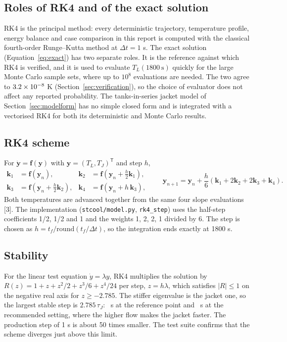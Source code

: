 \documentclass[11pt,letterpaper]{article}
\begin{document}
\subsection{Roles of RK4 and of the exact solution}
RK4 is the principal method: every deterministic trajectory, temperature profile, energy balance and case comparison in this report is computed with the classical fourth-order Runge--Kutta method at \(\Delta t = 1\) s. The exact solution (Equation~\ref{eq:exact}) has two separate roles. It is the reference against which RK4 is verified, and it is used to evaluate \(T_L(1800\ \mathrm{s})\) quickly for the large Monte Carlo sample sets, where up to \(10^8\) evaluations are needed. The two agree to \(3.2\times10^{-8}\) K (Section~\ref{sec:verification}), so the choice of evaluator does not affect any reported probability. The tanks-in-series jacket model of Section~\ref{sec:modelform} has no simple closed form and is integrated with a vectorised RK4 for both its deterministic and Monte Carlo results.

\subsection{RK4 scheme}
For \(\dot{\mathbf{y}} = \mathbf{f}(\mathbf{y})\) with \(\mathbf{y} = (T_L, T_J)^{\mathsf T}\) and step \(h\),
\begin{equation}
\begin{aligned}
\mathbf{k}_1 &= \mathbf{f}(\mathbf{y}_n), & \mathbf{k}_2 &= \mathbf{f}(\mathbf{y}_n + \tfrac{h}{2}\mathbf{k}_1),\\
\mathbf{k}_3 &= \mathbf{f}(\mathbf{y}_n + \tfrac{h}{2}\mathbf{k}_2), & \mathbf{k}_4 &= \mathbf{f}(\mathbf{y}_n + h\,\mathbf{k}_3),
\end{aligned}\qquad
\mathbf{y}_{n+1} = \mathbf{y}_n + \frac{h}{6}\left(\mathbf{k}_1 + 2\mathbf{k}_2 + 2\mathbf{k}_3 + \mathbf{k}_4\right). \label{eq:rk4}
\end{equation}
Both temperatures are advanced together from the same four slope evaluations [3]. The implementation (\texttt{stcool/model.py}, \texttt{rk4\_step}) uses the half-step coefficients 1/2, 1/2 and 1 and the weights 1, 2, 2, 1 divided by 6. The step is chosen as \(h = t_f/\mathrm{round}(t_f/\Delta t)\), so the integration ends exactly at 1800 s.

\subsection{Stability}
For the linear test equation \(\dot y = \lambda y\), RK4 multiplies the solution by \(R(z) = 1 + z + z^2/2 + z^3/6 + z^4/24\) per step, \(z = h\lambda\), which satisfies \(|R|\le 1\) on the negative real axis for \(z \ge -2.785\). The stiffer eigenvalue is the jacket one, so the largest stable step is \(2.785\,\tau_J\): \vStabBase\ s at the reference point and \vStabRec\ s at the recommended setting, where the higher flow makes the jacket faster. The production step of 1 s is about 50 times smaller. The test suite confirms that the scheme diverges just above this limit.
\end{document}
